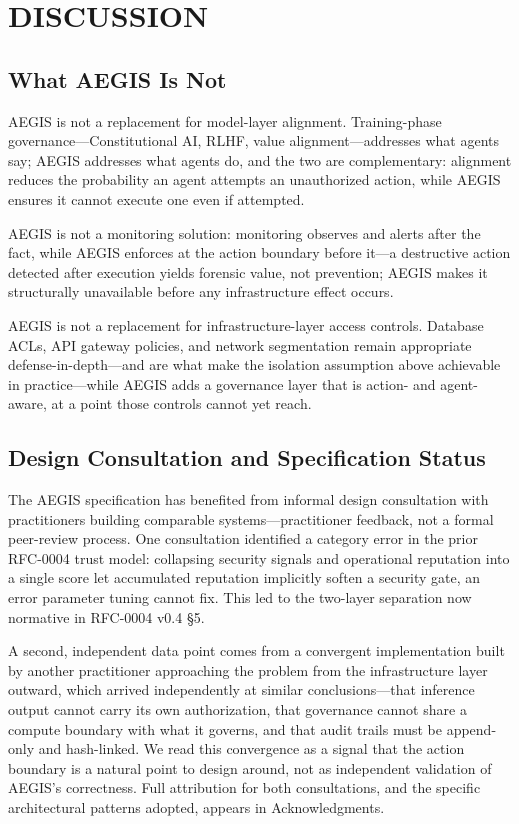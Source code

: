 \documentclass{IEEEcsmag}
\begin{document}
\section{DISCUSSION}

\subsection{What AEGIS Is Not}

AEGIS is not a replacement for model-layer alignment. Training-phase governance---Constitutional AI, RLHF, value alignment---addresses what agents say; AEGIS addresses what agents do, and the two are complementary: alignment reduces the probability an agent attempts an unauthorized action, while AEGIS ensures it cannot execute one even if attempted.

AEGIS is not a monitoring solution: monitoring observes and alerts after the fact, while AEGIS enforces at the action boundary before it---a destructive action detected after execution yields forensic value, not prevention; AEGIS makes it structurally unavailable before any infrastructure effect occurs.

AEGIS is not a replacement for infrastructure-layer access controls. Database ACLs, API gateway policies, and network segmentation remain appropriate defense-in-depth---and are what make the isolation assumption above achievable in practice---while AEGIS adds a governance layer that is action- and agent-aware, at a point those controls cannot yet reach.

\subsection{Design Consultation and Specification Status}

The AEGIS specification has benefited from informal design consultation with practitioners building comparable systems---practitioner feedback, not a formal peer-review process. One consultation identified a category error in the prior RFC-0004 trust model: collapsing security signals and operational reputation into a single score let accumulated reputation implicitly soften a security gate, an error parameter tuning cannot fix. This led to the two-layer separation now normative in RFC-0004 v0.4 \S5.

A second, independent data point comes from a convergent implementation built by another practitioner approaching the problem from the infrastructure layer outward, which arrived independently at similar conclusions---that inference output cannot carry its own authorization, that governance cannot share a compute boundary with what it governs, and that audit trails must be append-only and hash-linked. We read this convergence as a signal that the action boundary is a natural point to design around, not as independent validation of AEGIS's correctness. Full attribution for both consultations, and the specific architectural patterns adopted, appears in Acknowledgments.
\end{document}
